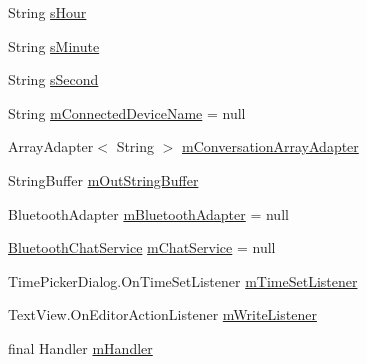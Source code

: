 \begin{DoxyCompactItemize}
\item 
String \hyperlink{classcom_1_1example_1_1android_1_1_bluetooth_chat_1_1_l_a_s_a_r_control_a5524f6769a80d9b5e77ec542cc7dc853}{s\-Hour}
\item 
String \hyperlink{classcom_1_1example_1_1android_1_1_bluetooth_chat_1_1_l_a_s_a_r_control_aab0b396ab7d27b45600e2b89ed976215}{s\-Minute}
\item 
String \hyperlink{classcom_1_1example_1_1android_1_1_bluetooth_chat_1_1_l_a_s_a_r_control_a7477c36f44f025c46fb52baaedbc67f9}{s\-Second}
\item 
String \hyperlink{classcom_1_1example_1_1android_1_1_bluetooth_chat_1_1_l_a_s_a_r_control_af79a70149253856147d95a048cb2e0e5}{m\-Connected\-Device\-Name} = null
\item 
Array\-Adapter$<$ String $>$ \hyperlink{classcom_1_1example_1_1android_1_1_bluetooth_chat_1_1_l_a_s_a_r_control_ab44fa0d676297c382a5a38d2ed699cda}{m\-Conversation\-Array\-Adapter}
\item 
String\-Buffer \hyperlink{classcom_1_1example_1_1android_1_1_bluetooth_chat_1_1_l_a_s_a_r_control_a1e5b37d00e365d99f2679d9fcd2bc862}{m\-Out\-String\-Buffer}
\item 
Bluetooth\-Adapter \hyperlink{classcom_1_1example_1_1android_1_1_bluetooth_chat_1_1_l_a_s_a_r_control_ad12e510a017b89f0faad1251d695f8c2}{m\-Bluetooth\-Adapter} = null
\item 
\hyperlink{classcom_1_1example_1_1android_1_1_bluetooth_chat_1_1_bluetooth_chat_service}{Bluetooth\-Chat\-Service} \hyperlink{classcom_1_1example_1_1android_1_1_bluetooth_chat_1_1_l_a_s_a_r_control_a4665d67dfa98764ef38685021cd19a67}{m\-Chat\-Service} = null
\item 
Time\-Picker\-Dialog.\-On\-Time\-Set\-Listener \hyperlink{classcom_1_1example_1_1android_1_1_bluetooth_chat_1_1_l_a_s_a_r_control_a60b59659f70cac5b885689af30b20970}{m\-Time\-Set\-Listener}
\item 
Text\-View.\-On\-Editor\-Action\-Listener \hyperlink{classcom_1_1example_1_1android_1_1_bluetooth_chat_1_1_l_a_s_a_r_control_ac5c84f8a3ba36418f2fbaa4889f2bcdf}{m\-Write\-Listener}
\item 
final Handler \hyperlink{classcom_1_1example_1_1android_1_1_bluetooth_chat_1_1_l_a_s_a_r_control_ac596631c3faeaba71c591b7d6232c489}{m\-Handler}
\end{DoxyCompactItemize}
